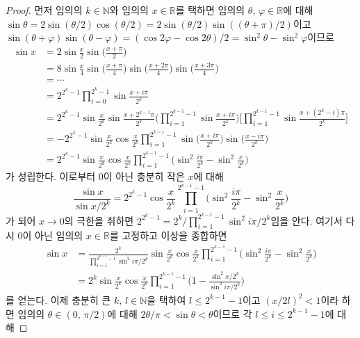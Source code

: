\begin{proof}
    먼저 임의의 $k\in\mathbb{N}$와 임의의 $x\in\mathbb{R}$를 택하면 임의의 $\theta,\,\varphi\in\mathbb{R}$에 대해 $\sin\theta=2\sin(\theta/2)\cos(\theta/2)=2\sin(\theta/2)\sin((\theta+\pi)/2)$이고 $\sin(\theta+\varphi)\sin(\theta-\varphi)=(\cos2\varphi-\cos2\theta)/2=\sin^2\theta-\sin^2\varphi$이므로
    \begin{align*}
        \sin x&=2\sin\frac{x}{2}\sin\bigg(\frac{x+\pi}{2}\bigg)\\
        &=8\sin\frac{x}{4}\sin\bigg(\frac{x+\pi}{4}\bigg)\sin\bigg(\frac{x+2\pi}{4}\bigg)\sin\bigg(\frac{x+3\pi}{4}\bigg)\\
        &=\cdots\\
        &=2^{2^k-1}\prod_{i=0}^{2^k-1}\sin\frac{x+i\pi}{2^k}\\
        &=2^{2^k-1}\sin\frac{x}{2^k}\sin\frac{x+2^{k-1}\pi}{2^k}\bigg(\prod_{i=1}^{2^{k-1}-1}\sin\frac{x+i\pi}{2^k}\bigg)\bigg[\prod_{i=1}^{2^{k-1}-1}\sin\frac{x+(2^k-i)\pi}{2^k}\bigg]\\
        &=-2^{2^k-1}\sin\frac{x}{2^k}\cos\frac{x}{2^k}\prod_{i=1}^{2^{k-1}-1}\sin\bigg(\frac{x+i\pi}{2^k}\bigg)\sin\bigg(\frac{x-i\pi}{2^k}\bigg)\\
        &=2^{2^k-1}\sin\frac{x}{2^k}\cos\frac{x}{2^k}\prod_{i=1}^{2^{k-1}-1}\bigg(\sin^2\frac{i\pi}{2^k}-\sin^2\frac{x}{2^k}\bigg)
    \end{align*}
    가 성립한다. 이로부터 $0$이 아닌 충분히 작은 $x$에 대해
    \begin{equation*}
        \frac{\sin x}{\sin x/2^k}=2^{2^k-1}\cos\frac{x}{2^k}\prod_{i=1}^{2^{k-1}-1}\bigg(\sin^2\frac{i\pi}{2^k}-\sin^2\frac{x}{2^k}\bigg)
    \end{equation*}
    가 되어 $x\to0$의 극한을 취하면 $2^{2^k-1}=2^k/\prod_{i=1}^{2^{k-1}-1}\sin^2i\pi/2^k$임을 안다. 여기서 다시 $0$이 아닌 임의의 $x\in\mathbb{R}$를 고정하고 이상을 종합하면
    \begin{align*}
        \sin x&=\frac{2^k}{\prod_{i=1}^{2^{k-1}-1}\sin^2i\pi/2^k}\sin\frac{x}{2^k}\cos\frac{x}{2^k}\prod_{i=1}^{2^{k-1}-1}\bigg(\sin^2\frac{i\pi}{2^k}-\sin^2\frac{x}{2^k}\bigg)\\
        &=2^k\sin\frac{x}{2^k}\cos\frac{x}{2^k}\prod_{i=1}^{2^{k-1}-1}\bigg(1-\frac{\sin^2x/2^k}{\sin^2i\pi/2^k}\bigg)
    \end{align*}
    를 얻는다. 이제 충분히 큰 $k,\,l\in\mathbb{N}$을 택하여 $l\leq 2^{k-1}-1$이고 $(x/2l)^2<1$이라 하면 임의의 $\theta\in(0,\,\pi/2)$에 대해 $2\theta/\pi<\sin\theta<\theta$이므로 각 $l\leq i\leq2^{k-1}-1$에 대해

\end{proof}
